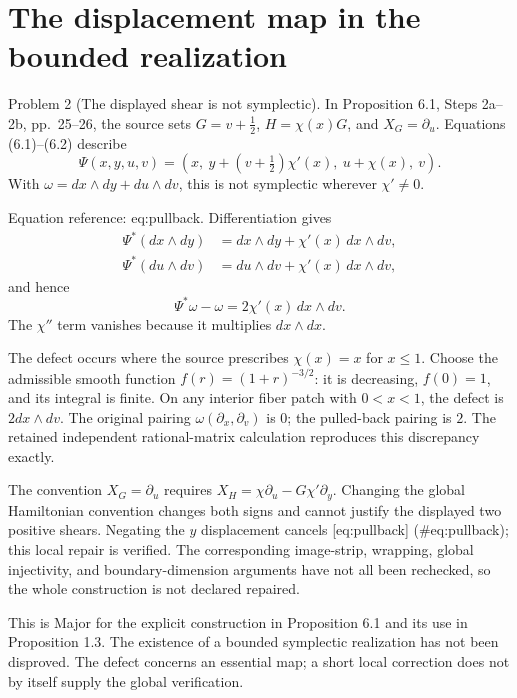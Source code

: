 \documentclass[10pt]{article}
\begin{document}
\section*{The displacement map in the bounded realization}
Problem 2 (The displayed shear is not symplectic).  In Proposition 6.1, Steps 2a–2b, pp. 25–26, the source sets \(G=v+\tfrac12\), \(H=\chi(x)G\), and \(X_G=\partial_u\). Equations (6.1)–(6.2) describe \[\Psi(x,y,u,v)=
 (x,\ y+(v+\tfrac12)\chi'(x),\ u+\chi(x),\ v).\] With \(\omega=dx\wedge dy+du\wedge dv\), this is not symplectic wherever \(\chi'\ne0\).\par
Equation reference: eq:pullback. Differentiation gives \[\begin{aligned}
 \Psi^*(dx\wedge dy)&=dx\wedge dy+\chi'(x)\,dx\wedge dv,\\
 \Psi^*(du\wedge dv)&=du\wedge dv+\chi'(x)\,dx\wedge dv,\end{aligned}\] and hence \[
 \Psi^*\omega-\omega=2\chi'(x)\,dx\wedge dv.\] The \(\chi''\) term vanishes because it multiplies \(dx\wedge dx\).\par
The defect occurs where the source prescribes \(\chi(x)=x\) for \(x\le1\). Choose the admissible smooth function \(f(r)=(1+r)^{-3/2}\): it is decreasing, \(f(0)=1\), and its integral is finite. On any interior fiber patch with \(0<x<1\), the defect is \(2dx\wedge dv\). The original pairing \(\omega(\partial_x,\partial_v)\) is \(0\); the pulled-back pairing is \(2\). The retained independent rational-matrix calculation reproduces this discrepancy exactly.\par
The convention \(X_G=\partial_u\) requires \(X_H=\chi\partial_u-G\chi'\partial_y\). Changing the global Hamiltonian convention changes both signs and cannot justify the displayed two positive shears. Negating the \(y\) displacement cancels [eq:pullback] (\#eq:pullback); this local repair is verified. The corresponding image-strip, wrapping, global injectivity, and boundary-dimension arguments have not all been rechecked, so the whole construction is not declared repaired.\par
This is Major for the explicit construction in Proposition 6.1 and its use in Proposition 1.3. The existence of a bounded symplectic realization has not been disproved. The defect concerns an essential map; a short local correction does not by itself supply the global verification.\par
\end{document}
